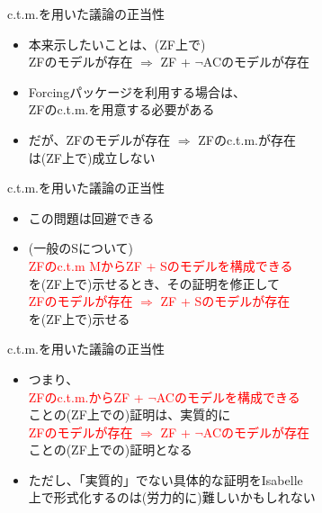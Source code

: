 \documentclass[17pt,aspectratio=169,xcolor=dvipsnames,table,dvipdfmx]{beamer}
\theoremstyle{definition}
\begin{document}
\begin{frame} {c.t.m.を用いた議論の正当性}
    \begin{itemize}
        \item 本来示したいことは、{\small (ZF上で)}\\
              ZFのモデルが存在 $\Rightarrow$ ZF + $\neg$ACのモデルが存在
        \item Forcingパッケージを利用する場合は、\\
              ZFのc.t.m.を用意する必要がある
        \item だが、ZFのモデルが存在 $\Rightarrow$ ZFのc.t.m.が存在\\
              は{\small (ZF上で)}成立しない
    \end{itemize}
\end{frame}

\begin{frame} {c.t.m.を用いた議論の正当性}
    \begin{itemize}
        \item この問題は回避できる
        \item {\small (一般のSについて) } \\
              \textcolor{red}{ZFのc.t.m MからZF + Sのモデルを構成できる}\\
              を{\small (ZF上で)}示せるとき、その証明を修正して\\
              \textcolor{red}{ZFのモデルが存在 $\Rightarrow$ ZF + Sのモデルが存在}\\
              を{\small (ZF上で)}示せる
    \end{itemize}
\end{frame}

\begin{frame} {c.t.m.を用いた議論の正当性}
    \begin{itemize}
        \item つまり、\\
              \textcolor{red}{ZFのc.t.m.からZF + $\neg$ACのモデルを構成できる}\\
              ことの{\small (ZF上での)}証明は、実質的に\\
              \textcolor{red}{ZFのモデルが存在 $\Rightarrow$ ZF + $\neg$ACのモデルが存在}\\
              ことの{\small (ZF上での)}証明となる
        \item ただし、「実質的」でない具体的な証明をIsabelle\\
              上で形式化するのは{\small (労力的に)}難しいかもしれない
    \end{itemize}
\end{frame}
\end{document}
